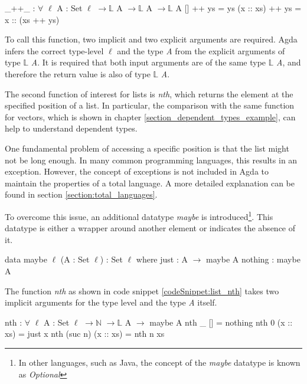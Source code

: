 \begin{codesnippet}[mathescape=true, caption={List concatenation function}, label={codeSnippet:list_append}]
_++_ : $\forall$ {$\ell$} {A : Set $\ell$} $\rightarrow \mathbb{L}$ A $\rightarrow \mathbb{L}$ A $\rightarrow \mathbb{L}$ A
  []        ++ ys = ys
  (x :: xs) ++ ys = x :: (xs ++ ys)
\end{codesnippet}

To call this function, two implicit and two explicit arguments are required. 
Agda infers the correct type-level $\ell$ and the type \emph{A} from the explicit arguments of type $\mathbb{L}$ \emph{A}. 
It is required that both input arguments are of the same type $\mathbb{L}$ \emph{A}, and therefore the return value is also of type $\mathbb{L}$ \emph{A}.

The second function of interest for lists is \emph{nth}, which returns the element at the specified position of a list.
In particular, the comparison with the same function for vectors, which is shown in chapter \ref{section_dependent_types_example}, can help to understand dependent types.

One fundamental problem of accessing a specific position is that the list might not be long enough.
In many common programming languages, this results in an exception. However, the concept of exceptions is not included in Agda to maintain the properties of a total language.
A more detailed explanation can be found in section \ref{section:total_languages}.

To overcome this issue, an additional datatype \emph{maybe} is introduced\footnote{In other languages, such as Java, the concept of the \emph{maybe} datatype is known as \emph{Optional}}.
This datatype is either a wrapper around another element or indicates the absence of it.

\begin{codesnippet}[mathescape=true, caption={Maybe datatype}, label={codeSnippet:maybe_datatype}]
data maybe {$\ell$} (A : Set $\ell$) : Set $\ell$ where
  just : A $\rightarrow$ maybe A
  nothing : maybe A
\end{codesnippet}

The function \emph{nth} as shown in code snippet \ref{codeSnippet:list_nth} takes two implicit arguments for the type level and the type \emph{A} itself.

\begin{codesnippet}[mathescape=true, caption={\emph{Nth} function for lists}, label={codeSnippet:list_nth}]
nth : $\forall$ {$\ell$} {A : Set $\ell$} $\rightarrow \mathbb{N}$ $\rightarrow \mathbb{L}$ A $\rightarrow$ maybe A
nth _ [] = nothing
nth 0 (x :: xs) = just x
nth (suc n) (x :: xs) = nth n xs
\end{codesnippet}

